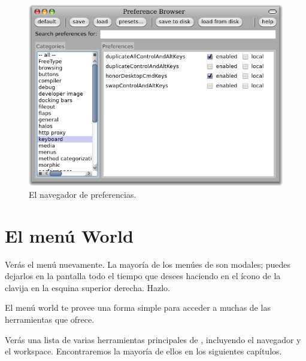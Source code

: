 \documentclass[a4paper,10pt,twoside]{book}
\begin{document}
\begin{figure}[htb]
\centerline{\includegraphics[width=\textwidth]{PreferenceBrowser}}
\caption{El navegador de preferencias.}
\end{figure}


\section{El men\'u World}

Ver\'as el men\'u  nuevamente.
La mayor\'ia de los men\'ues de \pharo son modales; puedes dejarlos en la pantalla todo el tiempo que desees haciendo \click en el \'icono de la clavija en la esquina superior derecha. Hazlo.

El men\'u world te provee una forma simple para acceder a muchas de las herramientas que \pharo ofrece.


Ver\'as una lista de varias herramientas principales de \pharo, incluyendo el navegador y el workspace.
Encontraremos la mayor\'ia de ellos en los siguientes cap\'itulos.

\end{document}
